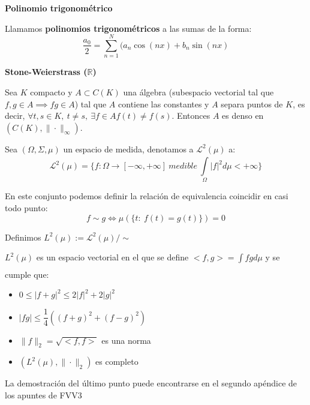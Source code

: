 \documentclass[openany]{book}
\begin{document}
\begin{definition}
  \textbf{Polinomio trigonométrico}

  Llamamos \textbf{polinomios trigonométricos} a las sumas de la forma:
  $$ \dfrac{a_0}{2} = \sum\limits_{n=1}^{N}(a_n \cos(nx)+b_n \sin(nx) $$

\end{definition}

\begin{theorem}
  \textbf{Stone-Weierstrass ($ \mathbb{R} $)}

  Sea $ K $ compacto  y $ A \subset C(K) $ una álgebra (subespacio vectorial tal que $ f,g \in A \implies fg \in A $) tal que $ A  $ contiene las constantes y $ A $ separa puntos de $ K $, es decir, $ \forall t,s \in K,\ t\ne s,\ \exists f \in A f(t) \ne f(s) $. Entonces $ A $ es denso en $ (C(K),\|\cdot \|_{\infty}) $.
\end{theorem}

\begin{definition}$  $\\
  Sea $ (\Omega,\Sigma,\mu) $ un espacio de medida, denotamos a $ \mathcal{L}^2(\mu) $ a:
  $$ \mathcal{L}^2(\mu) = \{f: \Omega \to [-\infty,+\infty]\ medible\ \int\limits_{\Omega}^{} |f|^2d \mu < +\infty\} $$

  En este conjunto podemos definir la relación de equivalencia coincidir en casi todo punto:
  $$ f \sim g \iff \mu(\{t:\ f(t) = g(t)\}) = 0  $$

  Definimos $ L^2(\mu):= \mathcal{L}^2(\mu) / \sim $
  

\end{definition}

\begin{proposition}
  $ L^2(\mu) $ es un espacio vectorial en el que se define $ <f,g> = \int\limits_{}^{}fg d\mu $ y se cumple que:
  \begin{itemize}
    \item $ 0\leq  |f+g|^2 \leq  2|f|^2+2|g|^2 $
    \item $|fg|\leq \dfrac{1}{4}((f+g)^2+(f-g)^2)$
    \item $ \|f\|_{2} = \sqrt{<f,f>} $ es una norma
    \item $ (L^2(\mu),\|\cdot \|_{2}) $ es completo
  \end{itemize}
  
\end{proposition}

La demostración del último punto puede encontrarse en el segundo apéndice de los apuntes de FVV3
\end{document}
